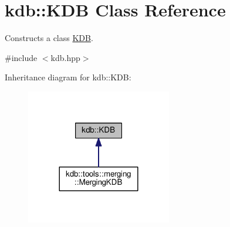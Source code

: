 \hypertarget{classkdb_1_1KDB}{}\section{kdb\+:\+:K\+DB Class Reference}
\label{classkdb_1_1KDB}


Constructs a class \hyperlink{classkdb_1_1KDB}{K\+DB}.  




{\ttfamily \#include $<$kdb.\+hpp$>$}



Inheritance diagram for kdb\+:\+:K\+DB\+:
\nopagebreak
\begin{figure}[H]
\begin{center}
\leavevmode
\includegraphics[width=180pt]{classkdb_1_1KDB__inherit__graph}
\end{center}
\end{figure}
